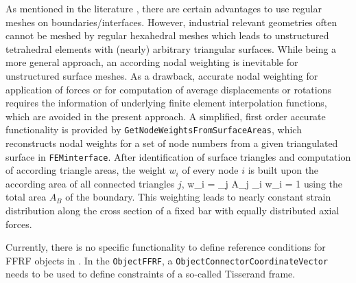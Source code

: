 %
As mentioned in the literature \cite{HeirmanDesmet2010}, there are certain advantages to use regular meshes on boundaries/interfaces.
However, industrial relevant geometries often cannot be meshed by regular hexahedral meshes which leads to unstructured tetrahedral elements with (nearly) arbitrary triangular surfaces.
While being a more general approach, an according nodal weighting is inevitable for unstructured surface meshes.
As a drawback, accurate nodal weighting for application of forces or for computation of average displacements or rotations requires the information of underlying finite element interpolation functions, which are avoided in the present approach.
A simplified, first order accurate functionality is provided by \texttt{GetNodeWeightsFromSurfaceAreas}, which reconstructs nodal weights for a set of node numbers from a given triangulated surface in \texttt{FEMinterface}.
After identification of surface triangles and computation of according triangle areas, the weight $w_i$ of every node $i$ is built upon the according area of all connected triangles $j$,
\be
  w_i =  \sum_{j} A_j  \eqComma \quad {} \quad \sum_i w_i = 1
\ee
using the total area $A_B$ of the boundary. 
This weighting leads to nearly constant strain distribution along the cross section of a fixed bar with equally distributed axial forces.

%
Currently, there is no specific functionality to define reference conditions for \ac{FFRF} objects in \codeName.
In the \texttt{ObjectFFRF}, a \texttt{ObjectConnectorCoordinateVector} needs to be used to define constraints of a so-called Tisserand frame.

